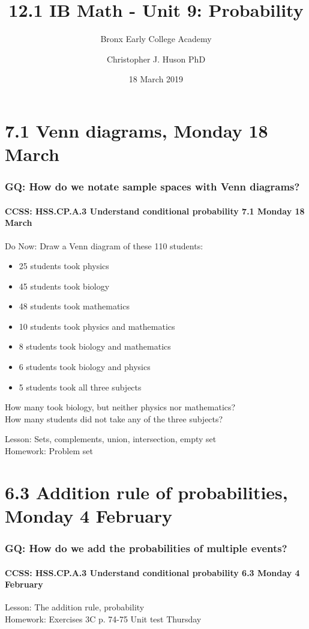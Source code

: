 \documentclass{beamer}
\title{12.1 IB Math - Unit 9: Probability}
\subtitle{Bronx Early College Academy}
\author{Christopher J. Huson PhD}
\date{18 March 2019}
\begin{document}
\frame{\titlepage}

\section[Outline]{}
\frame{\tableofcontents}

\section{7.1 Venn diagrams, Monday 18 March}
  \frame
  {
    \frametitle{GQ: How do we notate sample spaces with Venn diagrams?}
    \framesubtitle{CCSS: HSS.CP.A.3 Understand conditional probability \hfill  \alert{7.1 Monday 18 March}}

    \begin{block}{Do Now: Draw a Venn diagram of these 110 students:}
      \begin{itemize}
        \item 25 students took physics
        \item 45 students took biology
        \item 48 students took mathematics
        \item 10 students took physics and mathematics
        \item 8 students took biology and mathematics
        \item 6 students took biology and physics
        \item 5 students took all three subjects
      \end{itemize}
      How many took biology, but neither physics nor mathematics?\\
      How many students did not take any of the three subjects?
    \end{block}
    Lesson: Sets, complements, union, intersection, empty set \\ \bigskip
    Homework: Problem set
  }

\section{6.3 Addition rule of probabilities, Monday 4 February}
  \frame
  {
    \frametitle{GQ: How do we add the probabilities of multiple events?}
    \framesubtitle{CCSS: HSS.CP.A.3 Understand conditional probability \hfill \alert{6.3 Monday 4 February}}

    Lesson: The addition rule, probability \\
    Homework: Exercises 3C p. 74-75 \alert{Unit test Thursday}
  }
\end{document}
